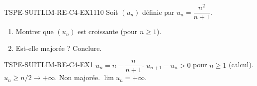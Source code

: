 

\begin{exercice}{TSPE-SUITLIM-RE-C4-EX1}{1}{10}
Soit $(u_n)$ définie par $u_n = \dfrac{n^2}{n+1}$.
\begin{enumerate}
  \item Montrer que $(u_n)$ est croissante (pour $n \geq 1$).
  \item Est-elle majorée ? Conclure.
\end{enumerate}
\end{exercice}


\begin{corrige}{TSPE-SUITLIM-RE-C4-EX1}
$u_n = n - \dfrac{n}{n+1}$. $u_{n+1}-u_n > 0$ pour $n \geq 1$ (calcul). $u_n \geq n/2 \to +\infty$. Non majorée. $\lim u_n = +\infty$.
\end{corrige}
